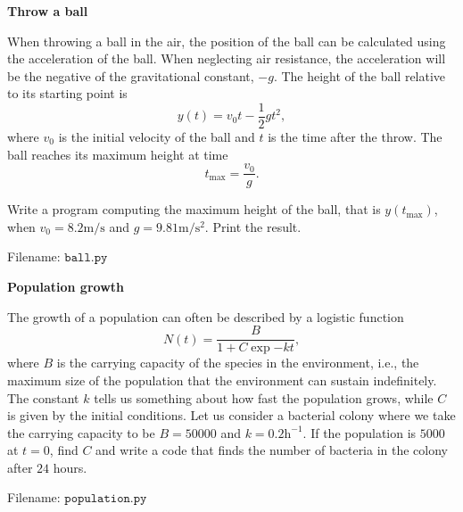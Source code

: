 
\begin{Problem}{\textbf{Throw a ball}} \label{prob11}

\noindent When throwing a ball in the air, the position of the ball can be calculated using the acceleration of the ball.  When neglecting air resistance, the acceleration will be the negative of the gravitational constant, $-g$. The height of the ball relative to its starting
point is
\begin{equation*}
y(t) = v_0t - \frac{1}{2}gt^2,
\end{equation*}
where $v_0$ is the initial velocity of the ball and $t$ is the time after the throw.
The ball reaches its maximum height at time
\begin{equation*}
t_{\text{max}} = \frac{v_0}{g}.
\end{equation*}

Write a program computing the maximum height of the ball, that is $y(t_{\text{max}})$,
when $v_0 = 8.2\mathrm{m/s}$ and $g = 9.81\mathrm{m/s^2}$. Print the result.

Filename: $\texttt{ball.py}$
\end{Problem}

	
\begin{Problem}{\textbf{Population growth}}\label{prob12}

\noindent The growth of a population can often be described by a logistic function
\begin{equation*}
N(t) = \frac{B}{1 + C \exp{-kt}},
\end{equation*}
where $B$ is the carrying capacity of the species in the environment, i.e., the
maximum size of the population that the environment can sustain indefinitely.
The constant $k$ tells us something about how fast the population grows, while $C$ is given
by the initial conditions. Let us consider a bacterial colony where we take the carrying
capacity to be $B = 50 000$ and $k = 0.2\mathrm{h^{-1}}$. If the population is
$5000$ at $t = 0$, find $C$ and write a code that finds the number of bacteria
in the colony after $24$ hours. 

Filename: $\texttt{population.py}$	
\end{Problem}

